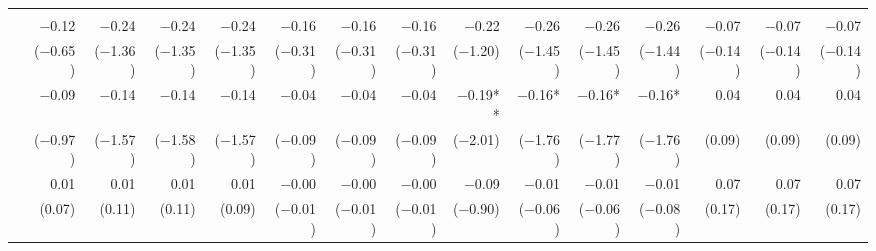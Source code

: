\begin{tabularx}{1.45\textwidth}{lRRRRRRRRRRRRRR}
		\midrule
		 \\[\panelspacing]
		 & \num{-0.12}\phantom{***)} & \num{-0.24}\phantom{***)} & \num{-0.24}\phantom{***)} & \num{-0.24}\phantom{***)} & \num{-0.16}\phantom{***)} & \num{-0.16}\phantom{***)} & \num{-0.16}\phantom{***)} & \num{-0.22}\phantom{***)} & \num{-0.26}\phantom{***)} & \num{-0.26}\phantom{***)} & \num{-0.26}\phantom{***)} & \num{-0.07}\phantom{***)} & \num{-0.07}\phantom{***)} & \num{-0.07}\phantom{***)} \\
		 & (\num{-0.65})\phantom{***} & (\num{-1.36})\phantom{***} & (\num{-1.35})\phantom{***} & (\num{-1.35})\phantom{***} & (\num{-0.31})\phantom{***} & (\num{-0.31})\phantom{***} & (\num{-0.31})\phantom{***} & (\num{-1.20})\phantom{***} & (\num{-1.45})\phantom{***} & (\num{-1.45})\phantom{***} & (\num{-1.44})\phantom{***} & (\num{-0.14})\phantom{***} & (\num{-0.14})\phantom{***} & (\num{-0.14})\phantom{***} \\ [\dspacing]
		 & \num{-0.09}\phantom{***)} & \num{-0.14}\phantom{***)} & \num{-0.14}\phantom{***)} & \num{-0.14}\phantom{***)} & \num{-0.04}\phantom{***)} & \num{-0.04}\phantom{***)} & \num{-0.04}\phantom{***)} & \num{-0.19}**\phantom{*)} & \num{-0.16}*\phantom{**)} & \num{-0.16}*\phantom{**)} & \num{-0.16}*\phantom{**)} & \num{0.04}\phantom{***)} & \num{0.04}\phantom{***)} & \num{0.04}\phantom{***)} \\
		 & (\num{-0.97})\phantom{***} & (\num{-1.57})\phantom{***} & (\num{-1.58})\phantom{***} & (\num{-1.57})\phantom{***} & (\num{-0.09})\phantom{***} & (\num{-0.09})\phantom{***} & (\num{-0.09})\phantom{***} & (\num{-2.01})\phantom{***} & (\num{-1.76})\phantom{***} & (\num{-1.77})\phantom{***} & (\num{-1.76})\phantom{***} & (\num{0.09})\phantom{***} & (\num{0.09})\phantom{***} & (\num{0.09})\phantom{***} \\ [\dspacing]
		 & \num{0.01}\phantom{***)} & \num{0.01}\phantom{***)} & \num{0.01}\phantom{***)} & \num{0.01}\phantom{***)} & \num{-0.00}\phantom{***)} & \num{-0.00}\phantom{***)} & \num{-0.00}\phantom{***)} & \num{-0.09}\phantom{***)} & \num{-0.01}\phantom{***)} & \num{-0.01}\phantom{***)} & \num{-0.01}\phantom{***)} & \num{0.07}\phantom{***)} & \num{0.07}\phantom{***)} & \num{0.07}\phantom{***)} \\
		 & (\num{0.07})\phantom{***} & (\num{0.11})\phantom{***} & (\num{0.11})\phantom{***} & (\num{0.09})\phantom{***} & (\num{-0.01})\phantom{***} & (\num{-0.01})\phantom{***} & (\num{-0.01})\phantom{***} & (\num{-0.90})\phantom{***} & (\num{-0.06})\phantom{***} & (\num{-0.06})\phantom{***} & (\num{-0.08})\phantom{***} & (\num{0.17})\phantom{***} & (\num{0.17})\phantom{***} & (\num{0.17})\phantom{***} \\ [\dspacing]

\end{tabularx}
